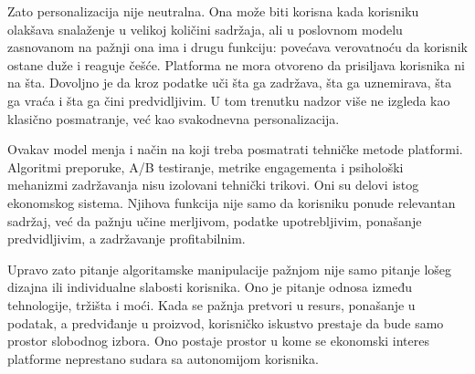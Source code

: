 Zato personalizacija nije neutralna. Ona može biti korisna kada korisniku olakšava snalaženje u velikoj količini sadržaja, ali u poslovnom modelu zasnovanom na pažnji ona ima i drugu funkciju: povećava verovatnoću da korisnik ostane duže i reaguje češće. Platforma ne mora otvoreno da prisiljava korisnika ni na šta. Dovoljno je da kroz podatke uči šta ga zadržava, šta ga uznemirava, šta ga vraća i šta ga čini predvidljivim. U tom trenutku nadzor više ne izgleda kao klasično posmatranje, već kao svakodnevna personalizacija.

Ovakav model menja i način na koji treba posmatrati tehničke metode platformi. Algoritmi preporuke, A/B testiranje, metrike engagementa i psihološki mehanizmi zadržavanja nisu izolovani tehnički trikovi. Oni su delovi istog ekonomskog sistema. Njihova funkcija nije samo da korisniku ponude relevantan sadržaj, već da pažnju učine merljivom, podatke upotrebljivim, ponašanje predvidljivim, a zadržavanje profitabilnim.

Upravo zato pitanje algoritamske manipulacije pažnjom nije samo pitanje lošeg dizajna ili individualne slabosti korisnika. Ono je pitanje odnosa između tehnologije, tržišta i moći. Kada se pažnja pretvori u resurs, ponašanje u podatak, a predviđanje u proizvod, korisničko iskustvo prestaje da bude samo prostor slobodnog izbora. Ono postaje prostor u kome se ekonomski interes platforme neprestano sudara sa autonomijom korisnika.